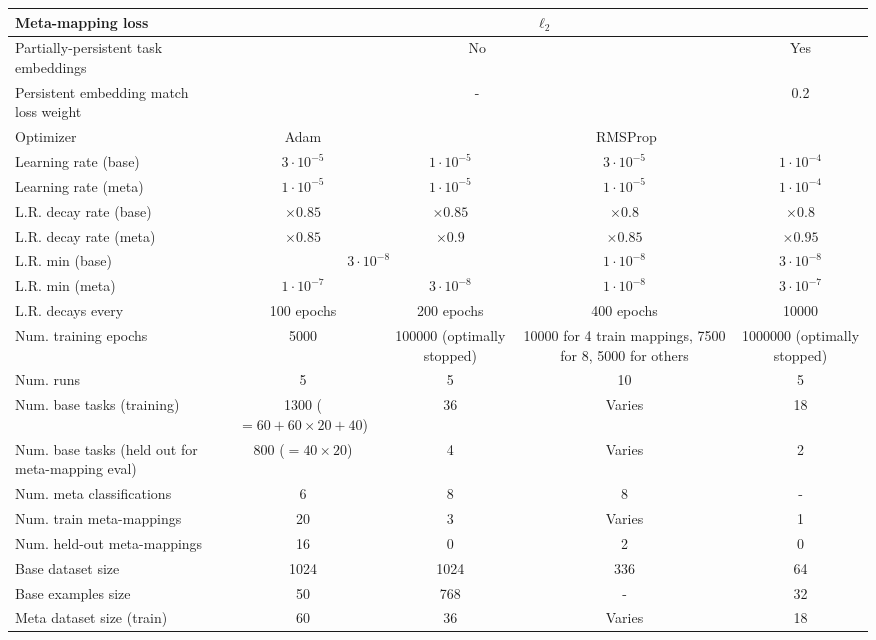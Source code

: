 \begin{table}
\begin{tabular}{|p{4cm}||c|c|c|c|}
Meta-mapping loss & \multicolumn{4}{c|}{$\ell_2$}\\\hline
Partially-persistent task embeddings & \multicolumn{3}{c|}{No} & Yes \\\hline
Persistent embedding match loss weight & \multicolumn{3}{c|}{-} & 0.2 \\\hline
\hline
Optimizer & Adam & \multicolumn{3}{c|}{RMSProp} \\\hline
Learning rate (base) & $3\cdot 10^{-5}$ & $1\cdot 10^{-5}$ & $3\cdot 10^{-5}$ & $1\cdot 10^{-4}$\\\hline
Learning rate (meta) & $1\cdot 10^{-5}$ & $1\cdot 10^{-5}$ & $1\cdot 10^{-5}$ & $1\cdot 10^{-4}$\\\hline
L.R. decay rate (base) & $\times0.85$ & $\times0.85$ & $\times0.8$ & $\times0.8$\\\hline
L.R. decay rate (meta) & $\times0.85$ & $\times0.9$ & $\times0.85$ & $\times0.95$ \\\hline
L.R. min (base) & \multicolumn{2}{c|}{$3 \cdot 10^{-8}$}  & $1 \cdot 10^{-8}$ & $3 \cdot 10^{-8}$\\\hline
L.R. min (meta) & $1 \cdot 10^{-7}$& $3 \cdot 10^{-8}$ &  $1 \cdot 10^{-8}$ & $3 \cdot 10^{-7}$\\\hline
L.R. decays every & 100 epochs & 200 epochs & 400 epochs & 10000 \\\hline
Num. training epochs & 5000 & \multicolumn{1}{p{2.3cm}|}{100000 (optimally stopped)} & \multicolumn{1}{p{2.3cm}|}{10000 for 4 train mappings, 7500 for 8, 5000 for others} & \multicolumn{1}{p{2.3cm}|}{1000000 (optimally stopped)} \\\hline
Num. runs & 5 & 5 & 10 & 5 \\ \hline
\hline
Num. base tasks (training) & \multicolumn{1}{p{2.3cm}|}{1300 ( $= 60 + 60 \times  20 + 40$)} & 36 & Varies & 18 \\\hline
Num. base tasks (held out for meta-mapping eval) & 800 ($= 40 \times 20$)  & 4 & Varies & 2 \\\hline
Num. meta classifications & 6 & 8 & 8 & - \\\hline
Num. train meta-mappings & 20 & 3 & Varies & 1 \\\hline
Num. held-out meta-mappings & 16 & 0 & 2 & 0  \\\hline
Base dataset size & 1024 & 1024 & 336 & 64 \\\hline
Base examples size & 50 & 768 & - & 32 \\\hline
Meta dataset size (train) & 60 & 36 & Varies & 18 \\\hline

\end{tabular}
\end{table}
